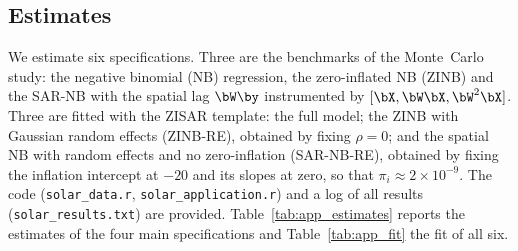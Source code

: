 \subsection{Estimates}\label{sec:app_results}

We estimate six specifications.
Three are the benchmarks of the Monte~Carlo study: the negative binomial (NB) regression, the zero-inflated NB (ZINB) and the SAR-NB with the spatial lag $\bW\by$ instrumented by $[\bX,\bW\bX,\bW^2\bX]$.
Three are fitted with the ZISAR template: the full model; the ZINB with Gaussian random effects (ZINB-RE), obtained by fixing $\rho = 0$; and the spatial NB with random effects and no zero-inflation (SAR-NB-RE), obtained by fixing the inflation intercept at $-20$ and its slopes at zero, so that $\pi_i\approx 2\times10^{-9}$.
The code (\texttt{solar\_data.r}, \texttt{solar\_application.r}) and a log of all results (\texttt{solar\_results.txt}) are provided.
Table~\ref{tab:app_estimates} reports the estimates of the four main specifications and Table~\ref{tab:app_fit} the fit of all six.

